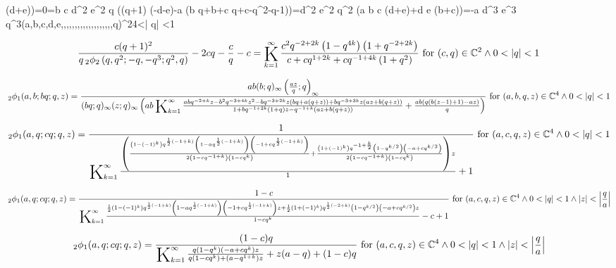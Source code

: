 \documentclass{article}
\newcommand{\bigK}{\mathop{\raisebox{-5pt}{\huge K}}}
\begin{document}
(d+e)\right)\land {}=0\land {}=b c d^2 e^2 q \left((q+1) (-d-e)-a \left(b q+b+c q+c-q^2-q-1\right)\right)\land {}=d^2 e^2 q^2 (a b c (d+e)+d e (b+c))\land {}=-a d^3 e^3 q^3\land (a,b,c,d,e,,,,,,,,,,,,,,,,,,,q)\in {}^{24}<\left| q\right| <1\] 

\[\frac{c (q+1)^2}{q \, _2\phi _2\left(q,q^2;-q,-q^3;q^2,q\right)}-2 c q-\frac{c}{q}-c=\bigK_{k=1}^{\infty}\frac{c^2 q^{-2+2 k} \left(1-q^{4 k}\right) \left(1+q^{-2+2 k}\right)}{c+c q^{1+2 k}+c q^{-1+4 k} \left(1+q^2\right)}\text{ for }(c,q)\in \mathbb{C}^2\land 0<\left| q\right| <1\] 

\[\, _2\phi _1(a,b;b q;q,z)=\frac{a b (b;q)_{\infty } \left(\frac{a z}{q};q\right)_{\infty }}{(b q;q)_{\infty } (z;q)_{\infty } \left(a b \bigK_{k=1}^{\infty}\frac{a b q^{-2+k} z-b^2 q^{-3+4 k} z^2-b q^{-3+2 k} z (b q+a (q+z))+b q^{-3+3 k} z (a z+b (q+z))}{1+b q^{-1+2 k} (1+q) z-q^{-1+k} (a z+b (q+z))}+\frac{a b (q (b (z-1)+1)-a z)}{q}\right)}\text{ for }(a,b,q,z)\in \mathbb{C}^4\land 0<\left| q\right| <1\] 

\[\, _2\phi _1(a,q;c q;q,z)=\frac{1}{\bigK_{k=1}^{\infty}\frac{\left(\frac{\left(1-(-1)^k\right) q^{\frac{1}{2} (-1+k)} \left(1-a q^{\frac{1}{2} (-1+k)}\right) \left(-1+c q^{\frac{1}{2} (-1+k)}\right)}{2 \left(1-c q^{-1+k}\right) \left(1-c q^k\right)}+\frac{\left(1+(-1)^k\right) q^{-1+\frac{k}{2}} \left(1-q^{k/2}\right) \left(-a+c q^{k/2}\right)}{2 \left(1-c q^{-1+k}\right) \left(1-c q^k\right)}\right) z}{1}+1}\text{ for }(a,c,q,z)\in \mathbb{C}^4\land 0<\left| q\right| <1\] 

\[\, _2\phi _1(a,q;c q;q,z)=\frac{1-c}{\bigK_{k=1}^{\infty}\frac{\frac{1}{2} \left(1-(-1)^k\right) q^{\frac{1}{2} (-1+k)} \left(1-a q^{\frac{1}{2} (-1+k)}\right) \left(-1+c q^{\frac{1}{2} (-1+k)}\right) z+\frac{1}{2} \left(1+(-1)^k\right) q^{\frac{1}{2} (-2+k)} \left(1-q^{k/2}\right) \left(-a+c q^{k/2}\right) z}{1-c q^k}-c+1}\text{ for }(a,c,q,z)\in \mathbb{C}^4\land 0<\left| q\right| <1\land \left| z\right| <\left| \frac{q}{a}\right|\] 

\[\, _2\phi _1(a,q;c q;q,z)=\frac{(1-c) q}{\bigK_{k=1}^{\infty}\frac{q \left(1-q^k\right) \left(-a+c q^k\right) z}{q \left(1-c q^k\right)+\left(a-q^{1+k}\right) z}+z (a-q)+(1-c) q}\text{ for }(a,c,q,z)\in \mathbb{C}^4\land 0<\left| q\right| <1\land \left| z\right| <\left| \frac{q}{a}\right|\] 
\end{document}
